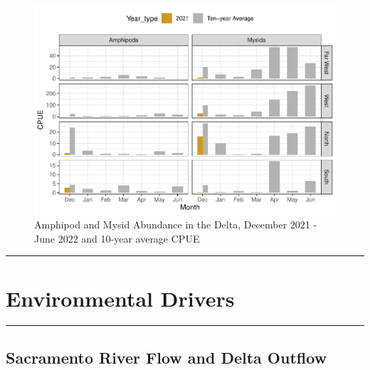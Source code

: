 \documentclass[
]{book}
\theoremstyle{definition}
\theoremstyle{definition}
\theoremstyle{definition}
\theoremstyle{definition}
\theoremstyle{remark}
\begin{document}
\begin{figure}
\centering
\includegraphics{_main_files/figure-latex/macro-fig-1.pdf}
\caption{\label{fig:macro-fig}Amphipod and Mysid Abundance in the Delta, December 2021 - June 2022 and 10-year average CPUE}
\end{figure}

\begin{center}\rule{0.5\linewidth}{0.5pt}\end{center}

\hypertarget{environmental-drivers-3}{%
\section{Environmental Drivers}\label{environmental-drivers-3}}

\begin{center}\rule{0.5\linewidth}{0.5pt}\end{center}

\hypertarget{sacramento-river-flow-and-delta-outflow}{%
\subsection{Sacramento River Flow and Delta Outflow}\label{sacramento-river-flow-and-delta-outflow}}
\end{document}

